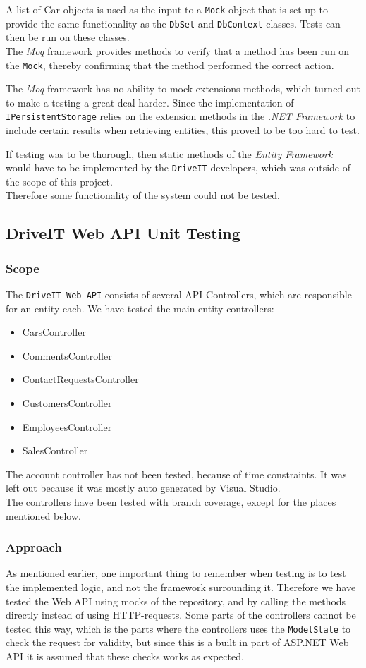 A list of Car objects is used as the input to a \texttt{Mock} object that is set up to provide the same functionality as the \texttt{DbSet} and \texttt{DbContext} classes. Tests can then be run on these classes.\\
The \textit{Moq} framework provides methods to verify that a method has been run on the \texttt{Mock}, thereby confirming that the method performed the correct action. 

The \textit{Moq} framework has no ability to mock extensions methods, which turned out to make a testing a great deal harder. Since the implementation of \texttt{IPersistentStorage} relies on the extension methods in the \textit{.NET Framework} to include certain results when retrieving entities, this proved to be too hard to test. 

If testing was to be thorough, then static methods of the \textit{Entity Framework} would have to be implemented by the \texttt{DriveIT} developers, which was outside of the scope of this project. \\Therefore some functionality of the system could not be tested.

\subsection{DriveIT Web API Unit Testing}
\subsubsection{Scope}
The \texttt{DriveIT Web API} consists of several API Controllers, which are responsible for an entity each. We have tested the main entity controllers:
\begin{itemize}
	\item CarsController
	\item CommentsController
	\item ContactRequestsController
	\item CustomersController
	\item EmployeesController
	\item SalesController
\end{itemize}
The account controller has not been tested, because of time constraints. It was left out because it was mostly auto generated by Visual Studio.\\

The controllers have been tested with branch coverage, except for the places mentioned below.
\subsubsection{Approach}
As mentioned earlier, one important thing to remember when testing is to test the implemented logic, and not the framework surrounding it. Therefore we have tested the Web API using mocks of the repository, and by calling the methods directly instead of using HTTP-requests.
Some parts of the controllers cannot be tested this way, which is the parts where the controllers uses the \texttt{ModelState} to check the request for validity, but since this is a built in part of ASP.NET Web API it is assumed that these checks works as expected.

